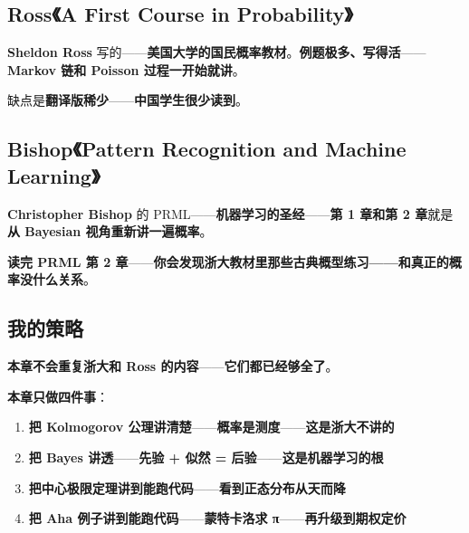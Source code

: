 \subsection{Ross《A First Course in Probability》}

\textbf{Sheldon Ross} 写的——\textbf{美国大学的国民概率教材}。\textbf{例题极多、写得活}——\textbf{Markov 链和 Poisson 过程一开始就讲}。

缺点是\textbf{翻译版稀少}——\textbf{中国学生很少读到}。

\subsection{Bishop《Pattern Recognition and Machine Learning》}

\textbf{Christopher Bishop} 的 PRML——\textbf{机器学习的圣经}——\textbf{第 1 章和第 2 章}就是\textbf{从 Bayesian 视角重新讲一遍概率}。

\textbf{读完 PRML 第 2 章}——\textbf{你会发现浙大教材里那些古典概型练习——和真正的概率没什么关系}。

\subsection{我的策略}

\textbf{本章不会重复浙大和 Ross 的内容}——\textbf{它们都已经够全了}。

\textbf{本章只做四件事}：

\begin{enumerate}
\item \textbf{把 Kolmogorov 公理讲清楚}——\textbf{概率是测度}——\textbf{这是浙大不讲的}
\item \textbf{把 Bayes 讲透}——\textbf{先验 + 似然 = 后验}——\textbf{这是机器学习的根}
\item \textbf{把中心极限定理讲到能跑代码}——\textbf{看到正态分布从天而降}
\item \textbf{把 Aha 例子讲到能跑代码}——\textbf{蒙特卡洛求 π}——\textbf{再升级到期权定价}
\end{enumerate}

